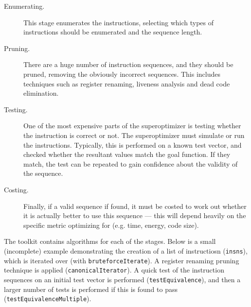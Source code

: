 \documentclass{article}
\begin{document}
\begin{description}
    \item[Enumerating.] This stage enumerates the instructions, selecting which types of instructions should be enumerated and the sequence length.
    \item[Pruning.] There are a huge number of instruction sequences, and they should be pruned, removing the obviously incorrect sequences. This includes techniques such as register renaming, liveness analysis and dead code elimination.
    \item[Testing.] One of the most expensive parts of the superoptimizer is testing whether the instruction is correct or not. The superoptimizer must simulate or run the instructions. Typically, this is performed on a known test vector, and checked whether the resultant values match the goal function. If they match, the test can be repeated to gain confidence about the validity of the sequence.
    \item[Costing.] Finally, if a valid sequence if found, it must be costed to work out whether it is actually better to use this sequence --- this will depend heavily on the specific metric optimizing for (e.g. time, energy, code size).
\end{description}

The toolkit contains algorithms for each of the stages. Below is a small (incomplete) example demonstrating the creation of a list of instructiosn (\texttt{insns}), which is iterated over (with \texttt{bruteforceIterate}). A register renaming pruning technique is applied (\texttt{canonicalIterator}). A quick test of the instruction sequences on an initial test vector is performed (\texttt{testEquivalence}), and then a larger number of tests is performed if this is found to pass (\texttt{testEquivalenceMultiple}).
\end{document}

